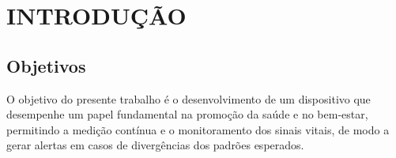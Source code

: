 \pagestyle{myheadings}
\setcounter{page}{9} %

\justifying

\section{INTRODUÇÃO}


\subsection{Objetivos}

O objetivo do presente trabalho é o desenvolvimento de um dispositivo que desempenhe um papel fundamental na promoção da saúde e no bem-estar, permitindo a medição contínua e o monitoramento dos sinais vitais, de modo a gerar alertas em casos de divergências dos padrões esperados.

